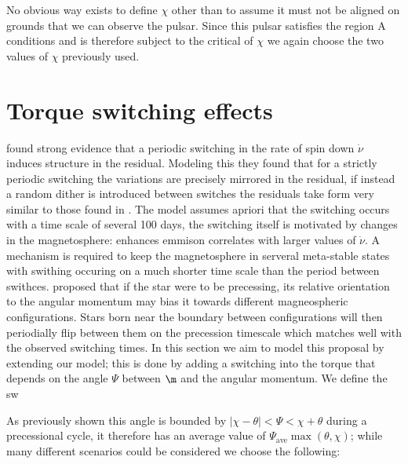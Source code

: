 \documentclass[/home/greg/Thesis/main/main.tex]{subfiles}
\begin{document}
No obvious way exists to define $\chi$ other than to assume it must not be aligned on grounds that we can observe the pulsar. Since this pulsar satisfies the region A conditions and is therefore subject to the critical of $\chi$ we again choose the two values of $\chi$ previously used.

\FloatBarrier
\section{Torque switching effects}

\citet{Lyne2010} found strong evidence that a periodic switching in the rate of
spin down $\dot\nu$ induces structure in the residual. Modeling this they found
that for a strictly periodic switching the variations are precisely mirrored in
the residual, if instead a random dither is introduced between switches the
residuals take form very similar to those found in \citet{Hobbs2010}. The model
assumes apriori that the switching occurs with a time scale of several 100
days, the switching itself is motivated by changes in the magnetosphere:
enhances emmison correlates with larger values of $\dot\nu$. A mechanism is
required to keep the magnetosphere in serveral meta-stable states with swithing
occuring on a much shorter time scale than the period between swithces.
\citet{Jones2010} %
proposed that if the star were to be precessing, its relative orientation to
the angular momentum may bias it towards different magneospheric
configurations. Stars born near the boundary between configurations will then
periodially flip between them on the precession timescale which matches well
with the observed switching times. In this section we aim to model this
proposal by extending our model; this is done by adding a switching into the
torque that depends on the angle $\Psi $ between $\m$ and the angular
momentum. We define the sw

As previously shown this angle is bounded by $|\chi - \theta| < \Psi
< \chi + \theta$ during a precessional cycle, it therefore has an average
value of $\Psi_{\textrm{ave}}\max(\theta, \chi)$; while many different
scenarios could be considered we choose the following: 
\end{document}
